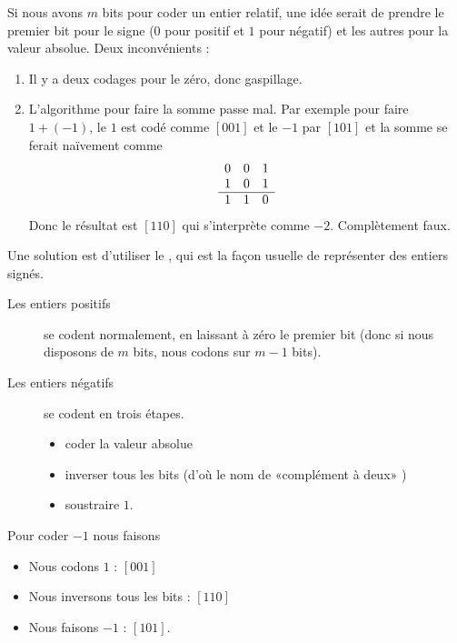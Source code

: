 Si nous avons \( m\) bits pour coder un entier relatif, une idée serait de prendre le premier bit pour le signe (\( 0\) pour positif et \( 1\) pour négatif) et les autres pour la valeur absolue. Deux inconvénients :
\begin{enumerate}
    \item
        Il y a deux codages pour le zéro, donc gaspillage.
    \item
        L'algorithme pour faire la somme passe mal. Par exemple pour faire \( 1+(-1)\), le \( 1\) est codé comme \( [001]\) et le \( -1\) par \( [101]\) et la somme se ferait naïvement comme
        \begin{equation*}
            \begin{array}[]{ccc}
                0&0&1\\
                1&0&1\\
                \hline
                1&1&0\\
            \end{array}
        \end{equation*}
        Donc le résultat est \( [110]\) qui s'interprète comme \( -2\). Complètement faux.
\end{enumerate}
Une solution est d'utiliser le , qui est la façon usuelle de représenter des entiers signés.
\begin{description}
    \item[Les entiers positifs] se codent normalement, en laissant à zéro le premier bit (donc si nous disposons de \( m\) bits, nous codons sur \( m-1\) bits).
    \item[Les entiers négatifs] se codent en trois étapes.
        \begin{itemize}
            \item coder la valeur absolue
            \item inverser tous les bits (d'où le nom de «complément à deux» )
            \item soustraire \( 1\).
        \end{itemize}
\end{description}

\begin{example}
    Pour coder \( -1\) nous faisons
    \begin{itemize}
        \item Nous codons \( 1\) : \( [001]\)
        \item Nous inversons tous les bits : \( [110]\)
        \item Nous faisons \( -1\) : \( [101]\).
    \end{itemize}
\end{example}

